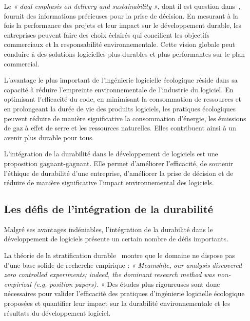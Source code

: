 Le \emph{« dual emphasis on delivery and sustainability »}, dont il est question dans~\cite{IntegrationSustainabilityMetrics}, fournit des informations précieuses pour la prise de décision.  En mesurant à la fois la performance des projets et leur impact sur le développement durable, les entreprises peuvent faire des choix éclairés qui concilient les objectifs commerciaux et la responsabilité environnementale. Cette vision globale peut conduire à des solutions logicielles plus durables et plus performantes sur le plan commercial.


L'avantage le plus important de l'ingénierie logicielle écologique réside dans sa capacité à réduire l'empreinte environnementale de l'industrie du logiciel. En optimisant l'efficacité du code, en minimisant la consommation de ressources et en prolongeant la durée de vie des produits logiciels, les pratiques écologiques peuvent réduire de manière significative la consommation d'énergie, les émissions de gaz à effet de serre et les ressources naturelles.  Elles contribuent ainsi à un avenir plus durable pour tous.


L'intégration de la durabilité dans le développement de logiciels est une proposition gagnant-gagnant. Elle permet d'améliorer l'efficacité, de soutenir l'éthique de durabilité d'une entreprise, d'améliorer la prise de décision et de réduire de manière significative l'impact environnemental des logiciels.


\subsection{Les défis de l’intégration de la durabilité}
Malgré ses avantages indéniables, l'intégration de la durabilité dans le développement de logiciels présente un certain nombre de défis importants.


La théorie de la stratification durable~\cite{SustainableStratifiedTheory} montre que le domaine ne dispose pas d'une base solide de recherche empirique : \emph{« Meanwhile, our analysis discovered zero controlled experiments; indeed, the dominant research method was non-empirical (e.g. position papers). »} Des études plus rigoureuses sont donc nécessaires pour valider l'efficacité des pratiques d'ingénierie logicielle écologique proposées et quantifier leur impact sur la durabilité environnementale et les résultats du développement logiciel.


